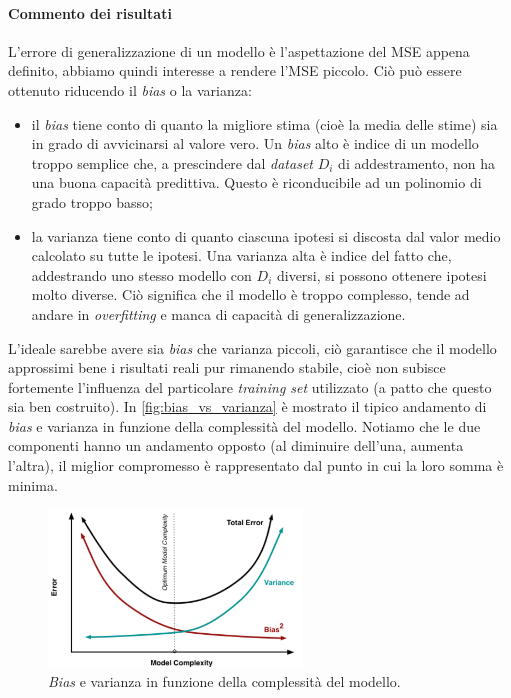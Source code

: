 \paragraph{Commento dei risultati}
L'errore di generalizzazione di un modello è l'aspettazione del MSE appena definito, abbiamo quindi interesse a rendere l'MSE piccolo. Ciò può essere ottenuto riducendo il \emph{bias} o la varianza:
\begin{itemize}
\item il \emph{bias} tiene conto di quanto la migliore stima (cioè la media delle stime) sia in grado di avvicinarsi al valore vero. Un \emph{bias} alto è indice di un modello troppo semplice che, a prescindere dal \emph{dataset} $D_i$ di addestramento, non ha una buona capacità predittiva. Questo è riconducibile ad un polinomio di grado troppo basso;
\item la varianza tiene conto di quanto ciascuna ipotesi si discosta dal valor medio calcolato su tutte le ipotesi. Una varianza alta è indice del fatto che, addestrando uno stesso modello con $D_i$ diversi, si possono ottenere ipotesi molto diverse. Ciò significa che il modello è troppo complesso, tende ad andare in \emph{overfitting} e manca di capacità di generalizzazione.
\end{itemize}


L'ideale sarebbe avere sia \emph{bias} che varianza piccoli, ciò garantisce che il modello approssimi bene i risultati reali pur rimanendo stabile, cioè non subisce fortemente l'influenza del particolare \emph{training set} utilizzato (a patto che questo sia ben costruito). In \autoref{fig:bias_vs_varianza} è mostrato il tipico andamento di \emph{bias} e varianza in funzione della complessità del modello. Notiamo che le due componenti hanno un andamento opposto (al diminuire dell'una, aumenta l'altra), il miglior compromesso è rappresentato dal punto in cui la loro somma è minima.

\begin{figure}[tbp]
\centering
  \includegraphics[width=0.6\textwidth]{images/bias_vs_var}
  \caption{\emph{Bias} e varianza in funzione della complessità del modello.}
  \label{fig:bias_vs_varianza}
\end{figure}


